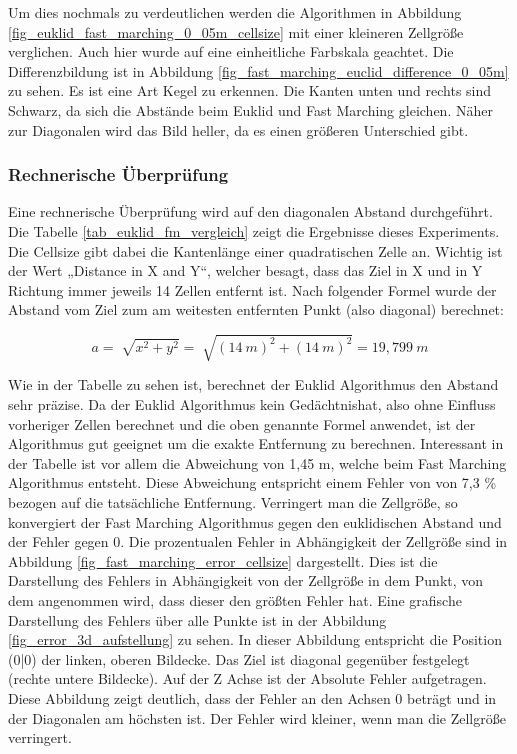 Um dies nochmals zu verdeutlichen werden die Algorithmen in Abbildung \ref{fig_euklid_fast_marching_0_05m_cellsize} mit einer kleineren Zellgröße verglichen. Auch hier wurde auf eine einheitliche Farbskala geachtet. Die Differenzbildung ist in Abbildung \ref{fig_fast_marching_euclid_difference_0_05m} zu sehen. Es ist eine Art Kegel zu erkennen. Die Kanten unten und rechts sind Schwarz, da sich die Abstände beim Euklid und Fast Marching gleichen. Näher zur Diagonalen wird das Bild heller, da es einen größeren Unterschied gibt.

\subsubsection{Rechnerische Überprüfung}
Eine rechnerische Überprüfung wird auf den diagonalen Abstand durchgeführt. Die Tabelle \ref{tab_euklid_fm_vergleich} zeigt die Ergebnisse dieses Experiments. Die Cellsize gibt dabei die Kantenlänge einer quadratischen Zelle an. Wichtig ist der Wert „Distance in X and Y“, welcher besagt, dass das Ziel in X und in Y Richtung immer jeweils 14 Zellen entfernt ist.
Nach folgender Formel wurde der Abstand vom Ziel zum am weitesten entfernten Punkt (also diagonal) berechnet:

$$a = \sqrt[]{x^2 +y^2} = \sqrt[]{(14\ m) ^2 +(14\ m) ^2} = 19,799\ m$$ 

Wie in der Tabelle zu sehen ist, berechnet der Euklid Algorithmus den Abstand sehr präzise. Da der Euklid Algorithmus kein \glqq Gedächtnis\grqq  hat, also ohne Einfluss vorheriger Zellen berechnet und die oben genannte Formel anwendet, ist der Algorithmus gut geeignet um die exakte Entfernung zu berechnen. Interessant in der Tabelle ist vor allem die Abweichung von 1,45 m, welche beim Fast Marching Algorithmus entsteht. Diese Abweichung entspricht einem Fehler von von 7,3 \% bezogen auf die tatsächliche Entfernung. Verringert man die Zellgröße, so konvergiert der Fast Marching Algorithmus gegen den euklidischen Abstand und der Fehler gegen 0. Die prozentualen Fehler in Abhängigkeit der Zellgröße sind in Abbildung \ref{fig_fast_marching_error_cellsize} dargestellt. Dies ist die Darstellung des Fehlers in Abhängigkeit von der Zellgröße in dem Punkt, von dem angenommen wird, dass dieser den größten Fehler hat. Eine grafische Darstellung des Fehlers über alle Punkte ist in der Abbildung \ref{fig_error_3d_aufstellung} zu sehen. In dieser Abbildung entspricht die Position (0|0) der linken, oberen Bildecke. Das Ziel ist diagonal gegenüber festgelegt (rechte untere Bildecke). Auf der Z Achse ist der Absolute Fehler aufgetragen. Diese Abbildung zeigt deutlich, dass der Fehler an den Achsen 0 beträgt und in der Diagonalen am höchsten ist. Der Fehler wird kleiner, wenn man die Zellgröße verringert.



